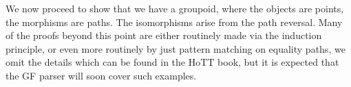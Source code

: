 \documentclass[11pt, a4paper]{article}
\begin{document}
We now proceed to show that we have a groupoid, where the objects are points,
the morphisms are paths. The isomorphisms arise from the path reversal.  Many
of the proofs beyond this point are either routinely made via the induction
principle, or even more routinely by just pattern matching on equality paths,
we omit the details which can be found in the HoTT book, but it is expected
that the GF parser will soon cover such examples.

\begin{code}%
%
\>[2]\AgdaSpace{}%
\AgdaSymbol{:}\AgdaSpace{}%
\AgdaSymbol{\{}\AgdaSpace{}%
\AgdaSymbol{:}\AgdaSpace{}%
\AgdaSymbol{\}}\AgdaSpace{}%
\AgdaSymbol{\{}\AgdaSpace{}%
\AgdaSpace{}%
\AgdaSymbol{:}\AgdaSpace{}%
\AgdaSymbol{\}}\AgdaSpace{}%
\AgdaSymbol{(}\AgdaSpace{}%
\AgdaSymbol{:}\AgdaSpace{}%
\AgdaSpace{}%
\AgdaSpace{}%
\AgdaSymbol{)}\AgdaSpace{}%
\AgdaSpace{}%
\AgdaSpace{}%
\AgdaSpace{}%
\AgdaSpace{}%
\AgdaSpace{}%
\<%
\\
%
\>[2]\AgdaSpace{}%
\AgdaSymbol{\{}\AgdaSymbol{\}}\AgdaSpace{}%
\AgdaSymbol{\{}\AgdaSymbol{\}}\AgdaSpace{}%
\AgdaSymbol{\{}\AgdaSymbol{\}}\AgdaSpace{}%
\AgdaSpace{}%
\AgdaSymbol{=}\AgdaSpace{}%
\AgdaSpace{}%
\AgdaSpace{}%
\AgdaSpace{}%
\AgdaSpace{}%
\AgdaSpace{}%
\<%
\\
\>[2][@{}l@{\AgdaIndent{0}}]%
\>[4]\<%
\\
\>[4][@{}l@{\AgdaIndent{0}}]%
\>[6]\AgdaSpace{}%
\AgdaSymbol{:}\AgdaSpace{}%
\AgdaSymbol{(}\AgdaSpace{}%
\AgdaSpace{}%
\AgdaSymbol{:}\AgdaSpace{}%
\AgdaSymbol{)}\AgdaSpace{}%
\AgdaSpace{}%
\AgdaSpace{}%
\AgdaSpace{}%
\AgdaSpace{}%
\AgdaSpace{}%
\<%
\\
%
\>[6]\AgdaSpace{}%
\AgdaSpace{}%
\AgdaSpace{}%
\AgdaSpace{}%
\AgdaSymbol{=}\AgdaSpace{}%
\AgdaSpace{}%
\AgdaSpace{}%
\AgdaSpace{}%
\AgdaSpace{}%

\end{code}
\end{document}

